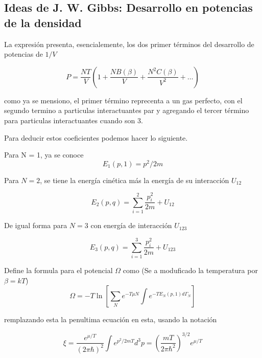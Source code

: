 \subsection{Ideas de J. W. Gibbs: Desarrollo en potencias de la densidad}

La expresión presenta, esencialemente, los dos primer términos del desarrollo
de potencias de $1/V$

\begin{equation}
    P = \frac{NT}{V}\left(
        1 + \frac{NB(\beta)}{V} + \frac{N^2 C(\beta)}{V^2} + \ldots
    \right)
\end{equation}

como ya se mensiono, el primer término reprecenta a un gas perfecto,
con el segundo termino a particulas interactuantes par y agregando 
el tercer término para particulas interactuantes cuando son 3.

Para deducir estos coeficientes podemos hacer lo siguiente.

Para N = 1, ya se conoce
\begin{equation}
    E_1(p, 1) = p^2/2m
\end{equation}

Para $N = 2$, se tiene la energía cinética más la energía
de su interacción $U_{12}$

\begin{equation}
    E_2(p, q) = \sum_{i=1}^{2} \frac{p_i^2}{2m} + {U_{12}}
\end{equation}

De igual forma para $N = 3$ con energía de interacción $U_{123}$

\begin{equation}
    E_3(p, q) = \sum_{i=1}^{3} \frac{p_i^2}{2m} + {U_{123}}
\end{equation}


\parencite[p.~124]{landau} Define la formula para el potencial $\Omega$
como (Se a moduficado la temperatura por $\beta = kT$)
\begin{equation}
    \Omega = -T \ln \left[
        \sum_{N}e^{-T\mu N}\int e^{-T E_N(p, 1) d\Gamma_N}
    \right]
\end{equation}

remplazando esta la penultima ecuación en esta, usando la notación

\begin{equation}
    \xi = \frac{e^{\mu/T}}{{(2\pi\hbar)}^2}
    \int e^{ p^2/2m T} d^3p 
    = {\left(\frac{mT}{2\pi\hbar^2}\right)}^{3/2}e^{\mu/T}
\end{equation}

